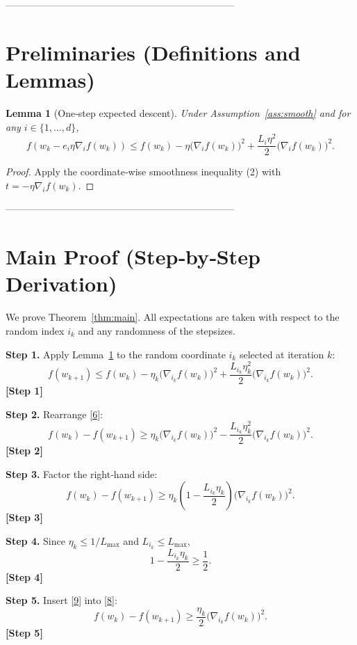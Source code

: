 \documentclass{article}
\newtheorem{lemma}{Lemma}
\begin{document}
-----------------------------------------------------------------------

\section*{Preliminaries (Definitions and Lemmas)}
\begin{lemma}[One‑step expected descent]\label{lem:descent}
Under Assumption~\ref{ass:smooth} and for any $i\in\{1,\dots ,d\}$,
\[
f(w_k-e_i\eta\nabla_i f(w_k))
\le f(w_k)-\eta\bigl(\nabla_i f(w_k)\bigr)^{2}
     +\frac{L_i\eta^{2}}{2}\bigl(\nabla_i f(w_k)\bigr)^{2}.
\tag{5}
\]
\end{lemma}
\begin{proof}
Apply the coordinate‑wise smoothness inequality (2) with $t=-\eta\nabla_i f(w_k)$.
\end{proof}

-----------------------------------------------------------------------

\section*{Main Proof (Step‑by‑Step Derivation)}
We prove Theorem~\ref{thm:main}.  All expectations are taken with respect
to the random index $i_k$ and any randomness of the stepsizes.

\noindent\textbf{Step 1.}  Apply Lemma~\ref{lem:descent} to the random coordinate
$i_k$ selected at iteration $k$:
\[
f(w_{k+1})\le f(w_k)-\eta_k\bigl(\nabla_{i_k}f(w_k)\bigr)^{2}
        +\frac{L_{i_k}\eta_k^{2}}{2}\bigl(\nabla_{i_k}f(w_k)\bigr)^{2}.
\tag{6}
\] 
\textbf{[Step 1]}

\noindent\textbf{Step 2.}  Rearrange \eqref{6}:
\[
f(w_{k})-f(w_{k+1})
\ge \eta_k\bigl(\nabla_{i_k}f(w_k)\bigr)^{2}
   -\frac{L_{i_k}\eta_k^{2}}{2}\bigl(\nabla_{i_k}f(w_k)\bigr)^{2}.
\tag{7}
\] 
\textbf{[Step 2]}

\noindent\textbf{Step 3.}  Factor the right‑hand side:
\[
f(w_{k})-f(w_{k+1})
\ge \eta_k\!\left(1-\frac{L_{i_k}\eta_k}{2}\right)
          \bigl(\nabla_{i_k}f(w_k)\bigr)^{2}.
\tag{8}
\] 
\textbf{[Step 3]}

\noindent\textbf{Step 4.}  Since $\eta_k\le 1/L_{\max}$ and $L_{i_k}\le L_{\max}$,
\[
1-\frac{L_{i_k}\eta_k}{2}\ge \frac12 .
\tag{9}
\] 
\textbf{[Step 4]}

\noindent\textbf{Step 5.}  Insert \eqref{9} into \eqref{8}:
\[
f(w_{k})-f(w_{k+1})
\ge \frac{\eta_k}{2}\bigl(\nabla_{i_k}f(w_k)\bigr)^{2}.
\tag{10}
\] 
\textbf{[Step 5]}
\end{document}
